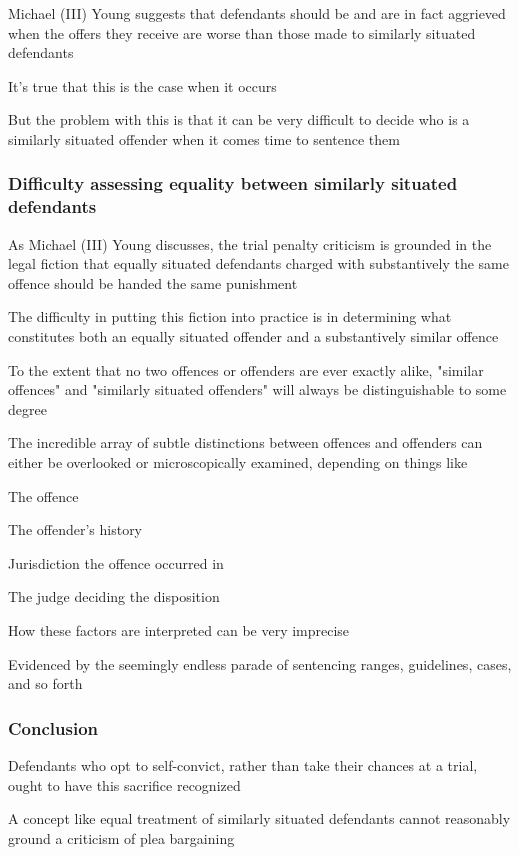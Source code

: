 Michael (III) Young suggests that defendants should be and are in fact aggrieved when the offers they receive are worse than those made to similarly situated defendants

It's true that this is the case when it occurs

But the problem with this is that it can be very difficult to decide who is a similarly situated offender when it comes time to sentence them

\subsubsection{Difficulty assessing equality between similarly situated defendants}

As Michael (III) Young discusses, the trial penalty criticism is grounded in the legal fiction that equally situated defendants charged with substantively the same offence should be handed the same punishment

The difficulty in putting this fiction into practice is in determining what constitutes both an equally situated offender and a substantively similar offence

To the extent that no two offences or offenders are ever exactly alike, "similar offences" and "similarly  situated offenders" will always be distinguishable to some degree

The incredible array of subtle distinctions between offences and offenders can either be overlooked or microscopically examined, depending on things like

The offence

The offender's history

Jurisdiction the offence occurred in

The judge deciding the disposition

How these factors are interpreted can be very imprecise

Evidenced by the seemingly endless parade of sentencing ranges, guidelines, cases, and so forth

\subsubsection{Conclusion}

Defendants who opt to self-convict, rather than take their chances at a trial, ought to have this sacrifice recognized

A concept like equal treatment of similarly situated defendants cannot reasonably ground a criticism of plea bargaining

